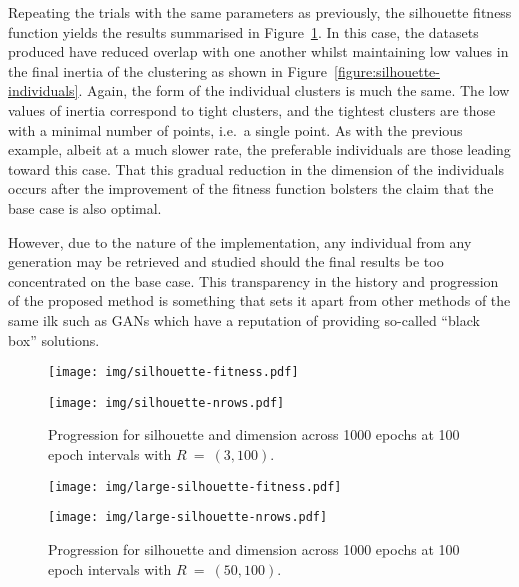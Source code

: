 Repeating the trials with the same parameters as previously, the silhouette
fitness function yields the results summarised in
Figure~\ref{figure:silhouette}. In this case, the datasets produced have reduced
overlap with one another whilst maintaining low values in the final inertia of
the clustering as shown in Figure~\ref{figure:silhouette-individuals}. Again,
the form of the individual clusters is much the same. The low values of inertia
correspond to tight clusters, and the tightest clusters are those with a minimal
number of points, i.e.\ a single point. As with the previous example, albeit at
a much slower rate, the preferable individuals are those leading toward this
case. That this gradual reduction in the dimension of the individuals occurs
after the improvement of the fitness function bolsters the claim that the base
case is also optimal.

However, due to the nature of the implementation, any individual from any
generation may be retrieved and studied should the final results be too
concentrated on the base case. This transparency in the history and progression
of the proposed method is something that sets it apart from other methods of the
same ilk such as GANs which have a reputation of providing so-called ``black
box'' solutions.

\begin{figure}[htbp]
    \ContinuedFloat*
    \centering
    \begin{minipage}{\imgwidth}
        \centering
        \texttt{[image: img/silhouette-fitness.pdf]}
    \end{minipage}

    \begin{minipage}{\imgwidth}
        \centering
        \texttt{[image: img/silhouette-nrows.pdf]}
    \end{minipage}
    \caption{Progression for silhouette and dimension across 1000 epochs at 100
             epoch intervals with \(R~=~(3,100)\).}\label{figure:silhouette}
\end{figure}

\begin{figure}[htbp]
    \ContinuedFloat%
    \centering
    \begin{minipage}{\imgwidth}
        \centering
        \texttt{[image: img/large-silhouette-fitness.pdf]}
    \end{minipage}

    \begin{minipage}{\imgwidth}
        \centering
        \texttt{[image: img/large-silhouette-nrows.pdf]}
    \end{minipage}
    \caption{Progression for silhouette and dimension across 1000 epochs at 100
             epoch intervals with
             \(R~=~(50,100)\).}\label{figure:large-silhouette}
\end{figure}

